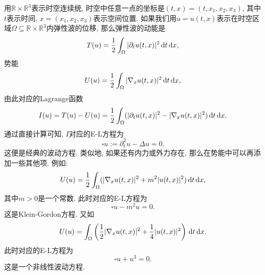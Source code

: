 \begin{example}
    用$\mathbb{R} \times \mathbb{R}^3$表示时空连续统, 时空中任意一点的坐标是$(t, x) = (t, x_1, x_2, x_3)$, 其中$t$表示时间, $x = (x_1, x_2, x_3)$表示空间位置.
    如果我们用$u = u(t, x)$表示在时空区域$\Omega \subseteq \mathbb{R} \times \mathbb{R}^3$内弹性波的位移, 那么弹性波的动能是 
    \begin{equation*}
        T(u) = \frac{1}{2}\int_{\Omega}|\partial_tu(t, x)|^2 \,{\rm d}t\,{\rm d}x, 
    \end{equation*}
    势能 
    \begin{equation*}
        U(u) =  \frac{1}{2}\int_{\Omega}|\nabla_xu(t, x)|^2 \,{\rm d}t\,{\rm d}x,
    \end{equation*}
    由此对应的Lagrange函数 
    \begin{equation*}
        I(u) = T(u) - U(u) = \frac{1}{2}\int_{\Omega}(|\partial_tu(t, x)|^2 - |\nabla_xu(t, x)|^2) \,{\rm d}t\,{\rm d}x. 
    \end{equation*}
    通过直接计算可知, $I$对应的E-L方程为 
    \begin{equation*}
        \square u := \partial_t^2u - \Delta u = 0.
    \end{equation*}
    这便是经典的波动方程. 类似地, 如果还有内力或外力存在, 那么在势能中可以再添加一些其他项. 例如:
    \begin{equation*}
        U(u) =  \frac{1}{2}\int_{\Omega}(|\nabla_xu(t, x)|^2 + m^2|u(t, x)|^2) \,{\rm d}t\,{\rm d}x,
    \end{equation*} 
    其中$m > 0$是一个常数. 此时对应的E-L方程为
    \begin{equation*}
        \square u - m^2u = 0.
    \end{equation*} 
    这是Klein-Gordon方程. 又如
    \begin{equation*}
        U(u) =  \int_{\Omega}\left(\frac{1}{2}|\nabla_xu(t, x)|^2 +\frac{1}{4} |u(t, x)|^2\right) \,{\rm d}t\,{\rm d}x.
    \end{equation*} 
    此时对应的E-L方程为 
    \begin{equation*}
        \square u + u^3 = 0.
    \end{equation*}
    这是一个非线性波动方程.
\end{example}

